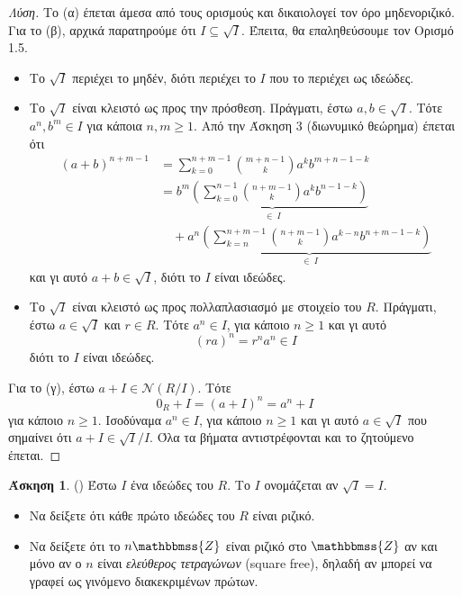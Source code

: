 \documentclass[12pt,a4paper,reqno]{amsart}
\theoremstyle{definition}
\newtheorem{exercise}{Άσκηση}
\newcommand{\ZZ}{\mathbbmss{Z}}
\newcommand{\nN}{\mathcal{N}}
\newcommand{\defn}[1]{{\color{mylightblue}{#1}}}
\begin{document}
\begin{proof}[Λύση]
  Το (α) έπεται άμεσα από τους ορισμούς και δικαιολογεί τον όρο μηδενοριζικό. Για το (β), αρχικά παρατηρούμε ότι $I \subseteq \sqrt{I}$. Έπειτα, θα επαληθεύσουμε τον Ορισμό 1.5.
  \begin{itemize}
    \item Το $\sqrt{I}$ περιέχει το μηδέν, διότι περιέχει το $I$ που το περιέχει ως ιδεώδες.
    \item Το $\sqrt{I}$ είναι κλειστό ως προς την πρόσθεση. Πράγματι, έστω $a, b \in \sqrt{I}$. Τότε $a^n, b^m \in I$ για κάποια $n, m \ge 1$. Από την Άσκηση 3 (διωνυμικό θεώρημα) έπεται ότι 
    \begin{align*}
      (a+b)^{n+m-1} 
      &= \sum_{k=0}^{n+m-1}\binom{m+n-1}{k} a^kb^{m+n-1-k} \\
      &= \underbrace{b^m\left(
        \sum_{k=0}^{n-1} \binom{n+m-1}{k} a^kb^{n-1-k} 
      \right)}_{\in \ I} \\
      &\quad + \underbrace{a^n\left(
        \sum_{k=n}^{n+m-1} \binom{n+m-1}{k} a^{k-n}b^{n+m-1-k}
      \right)}_{\in \ I}
    \end{align*}
    και γι αυτό $a + b \in \sqrt{I}$, διότι το $I$ είναι ιδεώδες.
    \item Το $\sqrt{I}$ είναι κλειστό ως προς πολλαπλασιασμό με στοιχείο του $R$. Πράγματι, έστω $a \in \sqrt{I}$ και $r \in R$. Τότε $a^n \in I$, για κάποιο $n \ge 1$ και γι αυτό 
    \[
    (ra)^n = r^n a^n \in I
    \]
    διότι το $I$ είναι ιδεώδες.
  \end{itemize}

  Για το (γ), έστω $a + I \in \nN(R/I)$. Τότε
  \[
  0_R + I = (a+I)^n = a^n + I
  \]
  για κάποιο $n \ge 1$. Ισοδύναμα $a^n \in I$, για κάποιο $n \ge 1$ και γι αυτό $a \in \sqrt{I}$ που σημαίνει ότι $a + I \in \sqrt{I}/I$. Όλα τα βήματα αντιστρέφονται και το ζητούμενο έπεται.
\end{proof}

\begin{exercise}{\rm(\cite[Άσκηση~7.4.31]{DF04})}
  \label{ex:DF_7.4.31}
  Έστω $I$ ένα ιδεώδες του $R$. Το $I$ ονομάζεται \defn{ριζικό} αν $\sqrt{I} = I$.
  \begin{itemize}
    \item[(α)] Να δείξετε ότι κάθε πρώτο ιδεώδες του $R$ είναι ριζικό.
    \item[(β)] Να δείξετε ότι το $n\ZZ$ είναι ριζικό στο $\ZZ$ αν και μόνο αν ο $n$ είναι \emph{ελεύθερος τετραγώνων} (square free), δηλαδή αν μπορεί να γραφεί ως γινόμενο διακεκριμένων πρώτων.  
  \end{itemize}
\end{exercise}
\end{document}

